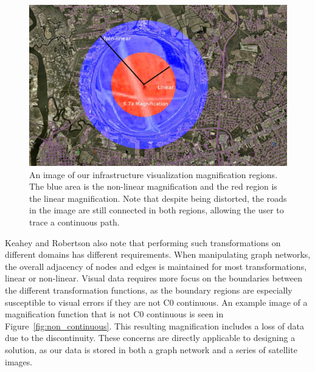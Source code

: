 \begin{figure}[htp] \centering
    \includegraphics[width=0.8\linewidth]{img/regions_diagram.jpg}
    \caption[Combined Linear and Non-linear Magnification Regions]{An image of our infrastructure visualization magnification regions. The blue area is the non-linear magnification and the red region is the linear magnification. Note that despite being distorted, the roads in the image are still connected in both regions, allowing the user to trace a continuous path.}
    \label{fig:regions_diagram}
\end{figure}

Keahey and Robertson also note that performing such transformations on different domains has different requirements. When manipulating graph networks, the overall adjacency of nodes and edges is maintained for most transformations, linear or non-linear. Visual data requires more focus on the boundaries between the different transformation functions, as the boundary regions are especially susceptible to visual errors if they are not C0 continuous. An example image of a
magnification function that is not C0 continuous is seen in Figure~\ref{fig:non_continuous}. This resulting magnification includes a loss of data due to the discontinuity. These concerns are directly
applicable to designing a solution, as our data is stored in both a graph network and a series of satellite images. 

